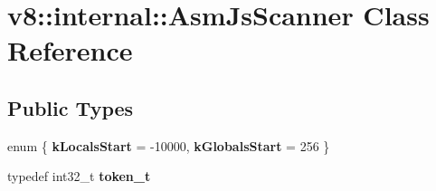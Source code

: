 \hypertarget{classv8_1_1internal_1_1AsmJsScanner}{}\section{v8\+:\+:internal\+:\+:Asm\+Js\+Scanner Class Reference}
\label{classv8_1_1internal_1_1AsmJsScanner}
\subsection*{Public Types}
\begin{DoxyCompactItemize}
\item 
\mbox{\label{classv8_1_1internal_1_1AsmJsScanner_a66e0be73f65962abafa43b8fc8a32ee7}} 
enum \{ {\bfseries k\+Locals\+Start} = -\/10000, 
{\bfseries k\+Globals\+Start} = 256
 \}
\item 
\mbox{\label{classv8_1_1internal_1_1AsmJsScanner_a2c7e5be71025efdbf52a683b2bc01569}} 
typedef int32\+\_\+t {\bfseries token\+\_\+t}
\end{DoxyCompactItemize}
